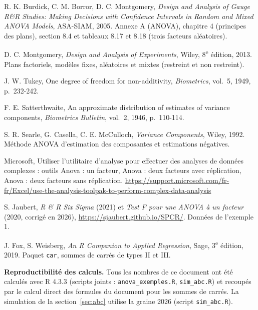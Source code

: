 \documentclass[11pt,a4paper]{article}
\theoremstyle{sj}
\theoremstyle{definition}
\theoremstyle{remark}
\providecommand{\og}{\guillemotleft\nobreakspace}
\providecommand{\fg}{\nobreakspace\guillemotright}
\begin{document}
\begin{enumerate}[label={[\arabic*]},leftmargin=2.2em,itemsep=3pt]
\item R. K. Burdick, C. M. Borror, D. C. Montgomery, \emph{Design and Analysis of Gauge R\&R Studies: Making Decisions with Confidence Intervals in Random and Mixed ANOVA Models}, ASA-SIAM, 2005. Annexe A (ANOVA), chapitre 4 (principes des plans), section 8.4 et tableaux 8.17 et 8.18 (trois facteurs aléatoires).
\item D. C. Montgomery, \emph{Design and Analysis of Experiments}, Wiley, 8\textsuperscript{e} édition, 2013. Plans factoriels, modèles fixes, aléatoires et mixtes (restreint et non restreint).
\item J. W. Tukey, \og One degree of freedom for non-additivity\fg{}, \emph{Biometrics}, vol.~5, 1949, p.~232-242.
\item F. E. Satterthwaite, \og An approximate distribution of estimates of variance components\fg{}, \emph{Biometrics Bulletin}, vol.~2, 1946, p.~110-114.
\item S. R. Searle, G. Casella, C. E. McCulloch, \emph{Variance Components}, Wiley, 1992. Méthode ANOVA d'estimation des composantes et estimations négatives.
\item Microsoft, \og Utiliser l'utilitaire d'analyse pour effectuer des analyses de données complexes\fg{} : outils \og Anova : un facteur\fg{}, \og Anova : deux facteurs avec réplication\fg{}, \og Anova : deux facteurs sans réplication\fg{}. \url{https://support.microsoft.com/fr-fr/Excel/use-the-analysis-toolpak-to-perform-complex-data-analysis}
\item S. Jaubert, \emph{R \& R Six Sigma} (2021) et \emph{Test F pour une ANOVA à un facteur} (2020, corrigé en 2026), \url{https://sjaubert.github.io/SPCR/}. Données de l'exemple 1.
\item J. Fox, S. Weisberg, \emph{An R Companion to Applied Regression}, Sage, 3\textsuperscript{e} édition, 2019. Paquet \texttt{car}, sommes de carrés de types II et III.
\end{enumerate}

\textbf{Reproductibilité des calculs.} Tous les nombres de ce document ont été calculés avec R 4.3.3 (scripts joints : \texttt{anova\_exemples.R}, \texttt{sim\_abc.R}) et recoupés par le calcul direct des formules du document pour les sommes de carrés. La simulation de la section~\ref{sec:abc} utilise la graine 2026 (script \texttt{sim\_abc.R}).
\end{document}
